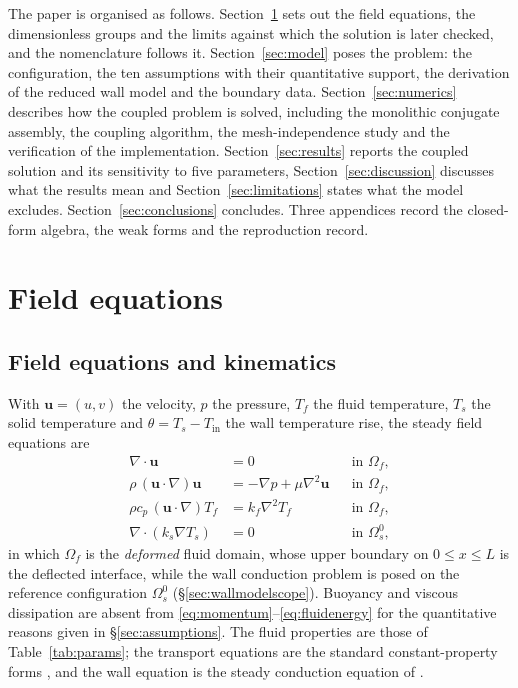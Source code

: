 \documentclass[11pt,a4paper]{article}
\newcommand{\bu}{\mathbf u}
\newcommand{\Om}{\Omega}
\begin{document}
The paper is organised as follows. Section~\ref{sec:equations} sets out the field
equations, the dimensionless groups and the limits against which the solution is later
checked, and the nomenclature follows it. Section~\ref{sec:model} poses the problem: the
configuration, the ten assumptions with their quantitative support, the derivation of the
reduced wall model and the boundary data. Section~\ref{sec:numerics} describes how the
coupled problem is solved, including the monolithic conjugate assembly, the coupling
algorithm, the mesh-independence study and the verification of the implementation.
Section~\ref{sec:results} reports the coupled solution and its sensitivity to five
parameters, Section~\ref{sec:discussion} discusses what the results mean and
Section~\ref{sec:limitations} states what the model excludes. Section~\ref{sec:conclusions}
concludes. Three appendices record the closed-form algebra, the weak forms and the
reproduction record.


\section{Field equations}
\label{sec:equations}

\subsection{Field equations and kinematics}
\label{sec:field}

With $\bu=(u,v)$ the velocity, $p$ the pressure, $T_f$ the fluid temperature,
$T_s$ the solid temperature and $\theta=T_s-T_{\mathrm{in}}$ the wall
temperature rise, the steady field equations are
\begin{align}
\nabla\cdot\bu &= 0 && \text{in } \Om_f, \label{eq:continuity}\\
\rho\,(\bu\cdot\nabla)\bu &= -\nabla p + \mu\nabla^2\bu && \text{in } \Om_f, \label{eq:momentum}\\
\rho c_p\,(\bu\cdot\nabla)T_f &= k_f\nabla^2 T_f && \text{in } \Om_f, \label{eq:fluidenergy}\\
\nabla\cdot(k_s\nabla T_s) &= 0 && \text{in } \Om_s^0, \label{eq:solidenergy}
\end{align}
in which $\Om_f$ is the \emph{deformed} fluid domain, whose upper boundary on
$0\le x\le L$ is the deflected interface, while the wall conduction problem
is posed on the reference configuration $\Om_s^0$ (\S\ref{sec:wallmodelscope}).
Buoyancy and viscous dissipation are absent from
\eqref{eq:momentum}--\eqref{eq:fluidenergy} for the quantitative reasons given
in \S\ref{sec:assumptions}. The fluid properties are those of
Table~\ref{tab:params}; the transport equations are the standard
constant-property forms \citep{bird1960transport}, and the wall equation is
the steady conduction equation of \citet{carslaw1947conduction}.
\end{document}
